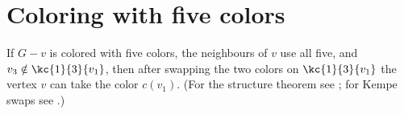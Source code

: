\section{Coloring with five colors}\label{sec:five-color}
If $G-v$ is colored with five colors, the neighbours of $v$ use all five, and $v_3 \notin \kc{1}{3}{v_1}$, then
after swapping the two colors on $\kc{1}{3}{v_1}$ the vertex $v$ can take the color $c(v_1)$.
(For the structure theorem see \cite{doe2004structure}; for Kempe swaps see \cite{lorem1988sufficiency}.)
